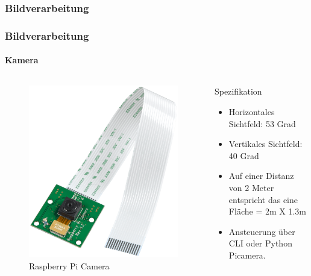\subsubsection{Bildverarbeitung}
\begin{frame}
	\frametitle{Bildverarbeitung\hfill{}\footnotesize \group}
	\framesubtitle{Kamera}
	
	\begin{columns}
		\begin{column}{0.5\textwidth}
			\begin{figure}
				\centering
				\includegraphics[width=1\textwidth]{../../fig/raspberry_pi_cam.png}
				\caption{Raspberry Pi Camera}
			\end{figure}
		\end{column}
		
		\begin{column}{0.5\textwidth}
			\begin{block}{Spezifikation}
				\begin{itemize}
					\item Horizontales Sichtfeld: 53 Grad
					\item Vertikales Sichtfeld: 40 Grad
					\item Auf einer Distanz von 2 Meter entspricht das eine Fläche = 2m X 1.3m
					\item Ansteuerung über CLI oder Python Picamera.
				\end{itemize}
			\end{block}
		\end{column}
		

\end{columns}
\end{frame}
